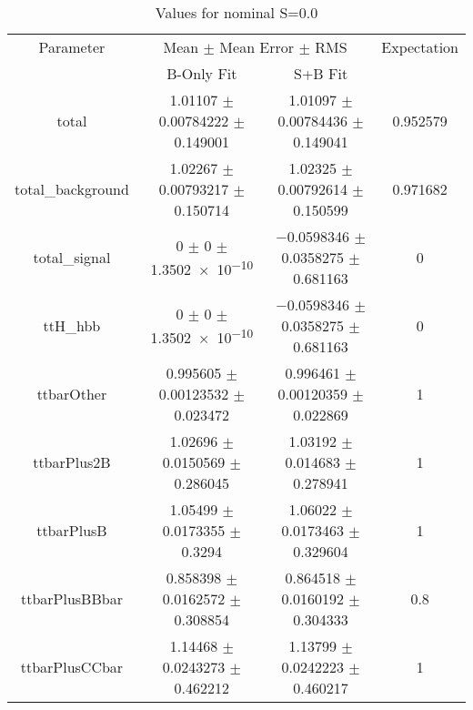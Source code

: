 \begin{table}
\centering
\caption{Values for nominal S=0.0}
\begin{tabular}{cccc}
\toprule
Parameter & \multicolumn{2}{c}{Mean $\pm$ Mean Error $\pm$ RMS} & Expectation\\
 & B-Only Fit & S+B Fit & \\
\midrule
total & \num{1.01107} $\pm$ \num{0.00784222} $\pm$ \num{0.149001} & \num{1.01097} $\pm$ \num{0.00784436} $\pm$ \num{0.149041} & \num{0.952579}\\
total\_background & \num{1.02267} $\pm$ \num{0.00793217} $\pm$ \num{0.150714} & \num{1.02325} $\pm$ \num{0.00792614} $\pm$ \num{0.150599} & \num{0.971682}\\
total\_signal & \num{0} $\pm$ \num{0} $\pm$ \num{1.3502e-10} & \num{-0.0598346} $\pm$ \num{0.0358275} $\pm$ \num{0.681163} & \num{0}\\
ttH\_hbb & \num{0} $\pm$ \num{0} $\pm$ \num{1.3502e-10} & \num{-0.0598346} $\pm$ \num{0.0358275} $\pm$ \num{0.681163} & \num{0}\\
ttbarOther & \num{0.995605} $\pm$ \num{0.00123532} $\pm$ \num{0.023472} & \num{0.996461} $\pm$ \num{0.00120359} $\pm$ \num{0.022869} & \num{1}\\
ttbarPlus2B & \num{1.02696} $\pm$ \num{0.0150569} $\pm$ \num{0.286045} & \num{1.03192} $\pm$ \num{0.014683} $\pm$ \num{0.278941} & \num{1}\\
ttbarPlusB & \num{1.05499} $\pm$ \num{0.0173355} $\pm$ \num{0.3294} & \num{1.06022} $\pm$ \num{0.0173463} $\pm$ \num{0.329604} & \num{1}\\
ttbarPlusBBbar & \num{0.858398} $\pm$ \num{0.0162572} $\pm$ \num{0.308854} & \num{0.864518} $\pm$ \num{0.0160192} $\pm$ \num{0.304333} & \num{0.8}\\
ttbarPlusCCbar & \num{1.14468} $\pm$ \num{0.0243273} $\pm$ \num{0.462212} & \num{1.13799} $\pm$ \num{0.0242223} $\pm$ \num{0.460217} & \num{1}\\
\bottomrule
\end{tabular}
\end{table}